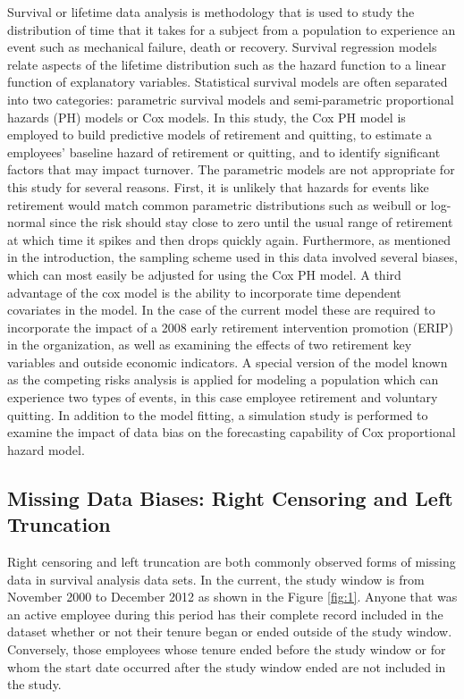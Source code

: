 \documentclass[12pt,letterpaper]{article}
\begin{document}
 Survival or lifetime data analysis is methodology that is used to study the distribution of time that it takes for a subject from a population to experience an event such as mechanical failure, death or recovery. Survival regression models relate aspects of the lifetime distribution such as the hazard function to a linear function of explanatory variables.  Statistical survival models are often separated into two categories: parametric survival models and semi-parametric proportional hazards (PH) models or Cox models. In this study, the Cox PH model is employed to build predictive models of retirement and quitting, to estimate a employees' baseline hazard of retirement or quitting, and to identify significant factors that may impact turnover. The parametric models are not appropriate for this study for several reasons. First, it is unlikely that hazards for events like retirement would match common parametric distributions such as weibull or log-normal since the risk should stay close to zero until the usual range of retirement at which time it spikes and then drops quickly again.  Furthermore, as mentioned in the introduction, the sampling scheme used in this data involved several biases, which can most easily be adjusted for using the Cox PH model. A third advantage of the cox model is the ability to incorporate time dependent covariates in the model. In the case of the current model these are required to incorporate the impact of a 2008 early retirement intervention promotion (ERIP) in the organization, as well as examining the effects of two retirement key variables and outside economic indicators. A special version of the model known as the competing risks analysis is applied for modeling a population which can experience two types of events, in this case employee retirement and voluntary quitting. In addition to the model fitting, a simulation study is performed to examine the impact of data bias on the forecasting capability of Cox proportional hazard model.
 \subsection{Missing Data Biases: Right Censoring and Left Truncation}\label{bias}
 Right censoring and left truncation are both commonly observed forms of missing data in survival analysis data sets. In the current, the study window is from November 2000 to December 2012 as shown in the Figure \ref{fig:1}.  Anyone that was an active employee during this period has their complete record included in the dataset whether or not their tenure began or ended outside of the study window.  Conversely, those employees whose tenure ended before the study window or for whom the start date occurred after the study window ended are not included in the study.
\end{document}
